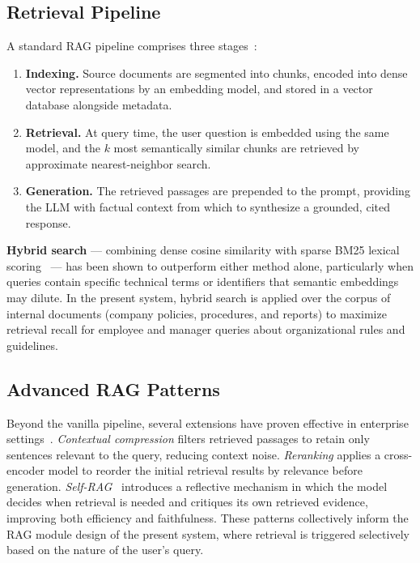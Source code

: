 \subsection{Retrieval Pipeline}

A standard RAG pipeline comprises three stages~\cite{gao2023rag}:

\begin{enumerate}
  \item \textbf{Indexing.} Source documents are segmented into chunks,
        encoded into dense vector representations by an embedding model,
        and stored in a vector database alongside metadata.
  \item \textbf{Retrieval.} At query time, the user question is embedded
        using the same model, and the $k$ most semantically similar chunks
        are retrieved by approximate nearest-neighbor search.
  \item \textbf{Generation.} The retrieved passages are prepended to the
        prompt, providing the LLM with factual context from which to
        synthesize a grounded, cited response.
\end{enumerate}

\textbf{Hybrid search} — combining dense cosine similarity with sparse BM25
lexical scoring~\cite{robertson2009bm25} — has been shown to outperform
either method alone, particularly when queries contain specific technical
terms or identifiers that semantic embeddings may dilute. In the present
system, hybrid search is applied over the corpus of internal documents
(company policies, procedures, and reports) to maximize retrieval recall
for employee and manager queries about organizational rules and guidelines.

\subsection{Advanced RAG Patterns}

Beyond the vanilla pipeline, several extensions have proven effective in
enterprise settings~\cite{gao2023rag}. \textit{Contextual compression}
filters retrieved passages to retain only sentences relevant to the query,
reducing context noise. \textit{Reranking} applies a cross-encoder model
to reorder the initial retrieval results by relevance before generation.
\textit{Self-RAG}~\cite{asai2023selfrag} introduces a reflective mechanism
in which the model decides when retrieval is needed and critiques its own
retrieved evidence, improving both efficiency and faithfulness. These
patterns collectively inform the RAG module design of the present system,
where retrieval is triggered selectively based on the nature of the user's
query.

